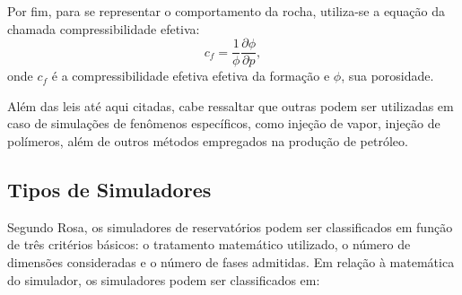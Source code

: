 Por fim, para se representar o comportamento da rocha, utiliza-se a equa\c{c}\~{a}o da chamada compressibilidade efetiva:
\begin{equation}
	c_f = \frac{1}{\phi} \frac{\partial\phi}{\partial p},
\end{equation}
onde $c_f$ \'{e} a compressibilidade efetiva efetiva da forma\c{c}\~{a}o e $\phi$, sua porosidade.

Al\'{e}m das leis at\'{e} aqui citadas, cabe ressaltar que outras podem ser utilizadas em caso de simula\c{c}\~{o}es de fen\^{o}menos espec\'{i}ficos, como inje\c{c}\~{a}o de vapor, inje\c{c}\~{a}o de pol\'{i}meros, al\'{e}m de outros m\'{e}todos empregados na produ\c{c}\~{a}o de petr\'{o}leo.

\subsection{Tipos de Simuladores}
Segundo Rosa, os simuladores de reservat\'{o}rios podem ser classificados em fun\c{c}\~{a}o de tr\^{e}s crit\'{e}rios b\'{a}sicos: o tratamento matem\'{a}tico utilizado, o n\'{u}mero de dimens\~{o}es consideradas e o n\'{u}mero de fases admitidas. Em rela\c{c}\~{a}o \`{a} matem\'{a}tica do simulador, os simuladores podem ser classificados em: 

